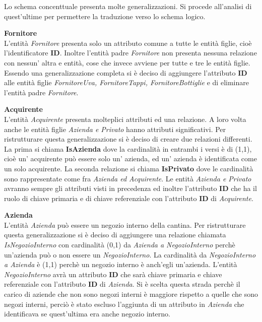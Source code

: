 Lo schema concenttuale presenta molte generalizzazioni. Si procede all'analisi di quest'ultime per permettere la traduzione verso lo schema logico.\\

\begin{flushleft}
\textbf{\large{Fornitore}}\\
L'entità \emph{Fornitore} presenta solo un attributo comune a tutte le entità figlie, cioè l'identificatore \textbf{ID}. Inoltre l'entità padre \emph{Fornitore} non presenta nessuna relazione con nessun' altra e entità, cose che invece avviene per tutte e tre le entità figlie. Essendo una generalizzazione completa si è deciso di aggiungere l'attributo \textbf{ID} alle entità figlie \emph{FornitoreUva, FornitoreTappi, FornitoreBottiglie} e di eliminare l'entità padre \emph{Fornitore}. 
\end{flushleft}


\begin{flushleft}
	\textbf{\large{Acquirente}}\\
	L'entità \emph{Acquirente} presenta molteplici attributi ed una relazione. A loro volta anche le entità figlie \emph{Azienda e Privato} hanno attributi significativi. Per ristrutturare questa generalizzazione si è deciso di creare due relazioni differenti. La prima si chiama \textbf{IsAzienda} dove la cardinalità in entrambi i versi è di (1,1), cioè un' acquirente può essere solo un' azienda, ed un' azienda è identificata come un solo acquirente.
	La seconda relazione si chiama \textbf{IsPrivato} dove le cardinalità sono rappresentate come fra \emph{Azienda ed Acquirente}. Le entità \emph{Azienda e Privato} avranno sempre gli attributi visti in precedenza ed inoltre l'attributo \textbf{ID} che ha il ruolo di chiave primaria e di chiave referenziale con l'attributo \textbf{ID} di \emph{Acquirente}. 
\end{flushleft}

\begin{flushleft}
	\textbf{\large{Azienda}}\\
	L'entità \emph{Azienda} può essere un negozio interno della cantina. Per ristrutturare questa generalizzazione si è deciso di aggiungere una relazione chiamata \emph{IsNegozioInterno} con cardinalità (0,1) da \emph{Azienda a NegozioInterno} perchè un'azienda può o non essere un \emph{NegozioInterno}. La cardinalità da \emph{NegozioInterno a Azienda} è (1,1) perchè un negozio interno è anch'egli un'azienda. L'entità \emph{NegozioInterno} avrà un attributo \textbf{ID} che sarà chiave primaria e chiave referenziale con l'attributo \textbf{ID} di \emph{Azienda}. Si è scelta questa strada perchè il carico di aziende che non sono negozi interni è maggiore rispetto a quelle che sono negozi interni, perciò è stato escluso l'aggiunta di un attributo in \emph{Azienda} che identificava se quest'ultima era anche negozio interno.
\end{flushleft}

